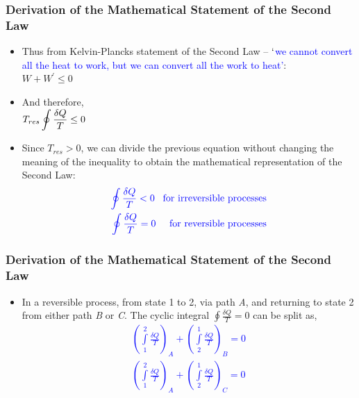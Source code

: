 \documentclass[10pt,compress]{beamer}
\begin{document}
\begin{frame}
 \frametitle{Derivation of the Mathematical Statement of the Second Law}
   \begin{itemize}
    \item <1-> Thus from Kelvin-Plancks statement of the Second Law -- \textcolor{blue}{$\lq$we cannot convert all the heat to work, but we can convert all the work to heat'}:\\
             $W + W^{\prime} \leq 0$
    \item <2-> And therefore,\\
             $T_{res} \displaystyle\displaystyle\oint \displaystyle\frac{\delta Q}{T} \leq 0$
    \item <3->  Since $T_{res} > 0$, we can divide the previous equation without changing the meaning of the inequality to obtain the mathematical representation of the Second Law:
             \begin{eqnarray}
             \textcolor{blue}{\displaystyle\oint \displaystyle\frac{\delta Q}{T} < 0 \;\;\; \text{for irreversible processes}} \nonumber \\
             \textcolor{blue}{\displaystyle\oint \displaystyle\frac{\delta Q}{T} = 0 \;\;\;\;\; \text{for reversible processes}} \nonumber 
             \end{eqnarray}
   \end{itemize}
 \normalsize
\end{frame}


\begin{frame}
 \frametitle{Derivation of the Mathematical Statement of the Second Law}
   \begin{itemize}
    \item <1-> In a reversible process, from state 1 to 2, via path {\it A}, and returning to state 2 from either path {\it B} or {\it C}. The cyclic integral $\displaystyle\oint\displaystyle\frac{\delta Q}{T} = 0$ can be split as,
         \textcolor{blue}{\begin{eqnarray}
          \left( \displaystyle\int\limits_{1}^{2} \displaystyle\frac{\delta Q}{T} \right)_{A} + \left( \displaystyle\int\limits_{2}^{1} \displaystyle\frac{\delta Q}{T} \right)_{B} = 0 \nonumber \\
          \left( \displaystyle\int\limits_{1}^{2} \displaystyle\frac{\delta Q}{T} \right)_{A} + \left( \displaystyle\int\limits_{2}^{1} \displaystyle\frac{\delta Q}{T} \right)_{C} = 0 \nonumber 
         \end{eqnarray}}
   \end{itemize}
 \normalsize
    
\end{frame}
\end{document}
